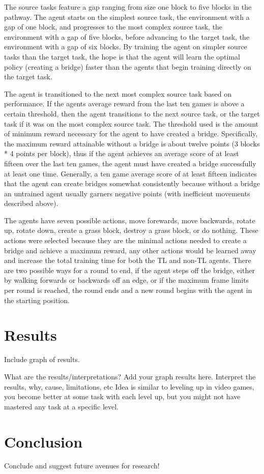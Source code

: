 \documentclass{article}
\begin{document}
The source tasks feature a gap ranging from size one block to five blocks in the pathway. 
The agent starts on the simplest source task, the environment with a gap of one block, and progresses to the most complex source task, the environment with a gap of five blocks, before advancing to the target task, the environment with a gap of six blocks.
By training the agent on simpler source tasks than the target task, the hope is that the agent will learn the optimal policy (creating a bridge) faster than the agents that begin training directly on the target task. 

The agent is transitioned to the next most complex source task based on performance.
If the agents average reward from the last ten games is above a certain threshold, then the agent transitions to the next source task, or the target task if it was on the most complex source task.
The threshold used is the amount of minimum reward necessary for the agent to have created a bridge. 
Specifically, the maximum reward attainable without a bridge is about twelve points (3 blocks * 4 points per block), thus if the agent achieves an average score of at least fifteen over the last ten games, the agent must have created a bridge successfully at least one time. 
Generally, a ten game average score of at least fifteen indicates that the agent can create bridges somewhat consistently because without a bridge an untrained agent usually garners negative points (with inefficient movements described above). 

The agents have seven possible actions, move forewards, move backwards, rotate up, rotate down, create a grass block, destroy a grass block, or do nothing. 
These actions were selected because they are the minimal actions needed to create a bridge and achieve a maximum reward, any other actions would be learned away and increase the total training time for both the TL and non-TL agents. 
There are two possible ways for a round to end, if the agent steps off the bridge, either by walking forwards or backwards off an edge, or if the maximum frame limits per round is reached, the round ends and a new round begins with the agent in the starting position. 


\section{Results}\label{results}

Include graph of results.

What are the results/interpretations?
Add your graph results here.
Interpret the results, why, cause, limitations, etc 
Idea is similar to leveling up in video games, you become better at some task with each level up, but you might not have mastered any task at a specific level.

\section{Conclusion}

Conclude and suggest future avenues for research!

\newpage{}



\end{document}
